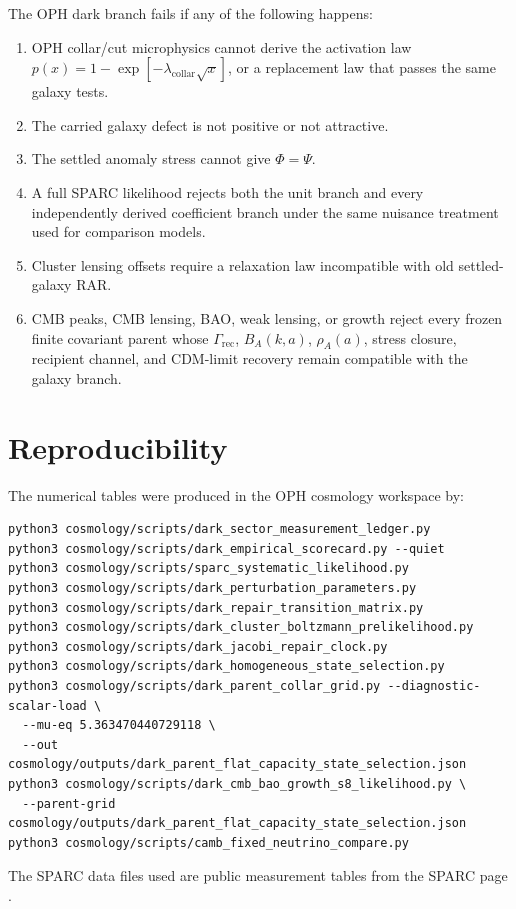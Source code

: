 \documentclass[11pt]{article}
\newcommand{\lambdac}{\lambda_{\mathrm{collar}}}
\begin{document}
The OPH dark branch fails if any of the following happens:
\begin{enumerate}
\item OPH collar/cut microphysics cannot derive the activation law
\(p(x)=1-\exp[-\lambdac\sqrt{x}]\), or a replacement law that passes the same
galaxy tests.
\item The carried galaxy defect is not positive or not attractive.
\item The settled anomaly stress cannot give \(\Phi=\Psi\).
\item A full SPARC likelihood rejects both the unit branch and every
independently derived coefficient branch under the same nuisance treatment used
for comparison models.
\item Cluster lensing offsets require a relaxation law incompatible with old
settled-galaxy RAR.
\item CMB peaks, CMB lensing, BAO, weak lensing, or growth reject every frozen
finite covariant parent whose \(\Gamma_{\mathrm{rec}}\), \(B_A(k,a)\),
\(\rho_A(a)\), stress closure, recipient channel, and CDM-limit recovery remain
compatible with the galaxy branch.
\end{enumerate}

\section{Reproducibility}

The numerical tables were produced in the OPH cosmology workspace by:
\begin{verbatim}
python3 cosmology/scripts/dark_sector_measurement_ledger.py
python3 cosmology/scripts/dark_empirical_scorecard.py --quiet
python3 cosmology/scripts/sparc_systematic_likelihood.py
python3 cosmology/scripts/dark_perturbation_parameters.py
python3 cosmology/scripts/dark_repair_transition_matrix.py
python3 cosmology/scripts/dark_cluster_boltzmann_prelikelihood.py
python3 cosmology/scripts/dark_jacobi_repair_clock.py
python3 cosmology/scripts/dark_homogeneous_state_selection.py
python3 cosmology/scripts/dark_parent_collar_grid.py --diagnostic-scalar-load \
  --mu-eq 5.363470440729118 \
  --out cosmology/outputs/dark_parent_flat_capacity_state_selection.json
python3 cosmology/scripts/dark_cmb_bao_growth_s8_likelihood.py \
  --parent-grid cosmology/outputs/dark_parent_flat_capacity_state_selection.json
python3 cosmology/scripts/camb_fixed_neutrino_compare.py
\end{verbatim}
The SPARC data files used are public measurement tables from the SPARC page
\cite{sparcpage}.
\end{document}
